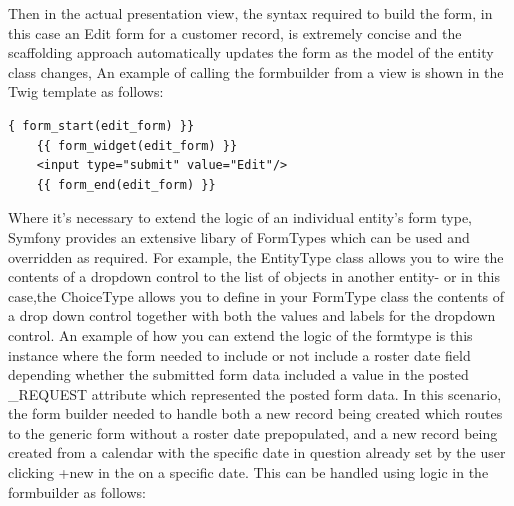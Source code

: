 \documentclass[a4paper,Times New Roman 11pt]{article}
\begin{document}
Then in the actual presentation view, the syntax required to build the form, in this case an Edit form for a customer record, is extremely concise and the scaffolding approach automatically updates the form as the model of the entity class changes, An example of calling the formbuilder from a view is shown in the Twig template as follows:

\begin{verbatim}
{ form_start(edit_form) }}
    {{ form_widget(edit_form) }}
    <input type="submit" value="Edit"/>
    {{ form_end(edit_form) }}
\end{verbatim}
Where it's necessary to extend the logic of an individual entity's form type, Symfony provides an extensive libary of FormTypes which can be used and overridden as required. For example, the EntityType class allows you to wire the contents of a dropdown control to the list of objects in another entity- or in this case,the ChoiceType allows you to define in your FormType class the contents of a drop down control together with both the values and labels for the dropdown control. An example of how you can extend the logic of the formtype is this instance where the form needed to include or not include a roster date field depending whether the submitted form data included a value in the posted \_REQUEST attribute which represented the posted form data. In this scenario, the form builder needed to handle both a new record being created which routes to the generic form without a roster date prepopulated, and a new record being created from a calendar with the specific date in question already set by the user clicking +new in the on a specific date.
This can be handled using logic in the formbuilder as follows:
\end{document}
